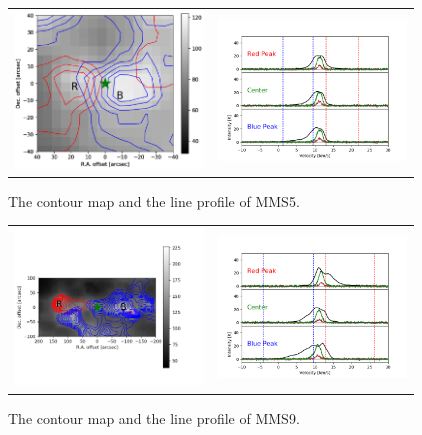 \documentclass[twoside,11pt]{gshs_thesis}
\begin{document}
\begin{figure}[h!]
	\begin{center}
		\begin{tabular}{cc}
			\includegraphics[width=5cm]{Orion_12CO2-1_MMS5_rbcontour_400_modified.png} &   \includegraphics[width=5cm]{Orion_12CO2-1_MMS5_line_profile_400.png} \\
		\end{tabular}
		\caption{The contour map and the line profile of MMS5. }
	\end{center}
\end{figure}
\clearpage
\newpage
\begin{figure}[h!]
	\begin{center}
		\begin{tabular}{cc}
			\includegraphics[width=5cm]{Orion_12CO2-1_MMS9_rbcontour_400_modified.png} &   \includegraphics[width=5cm]{Orion_12CO2-1_MMS9_line_profile_400.png} \\
		\end{tabular}
		\caption{The contour map and the line profile of MMS9. }
	\end{center}
\end{figure}
\end{document}
